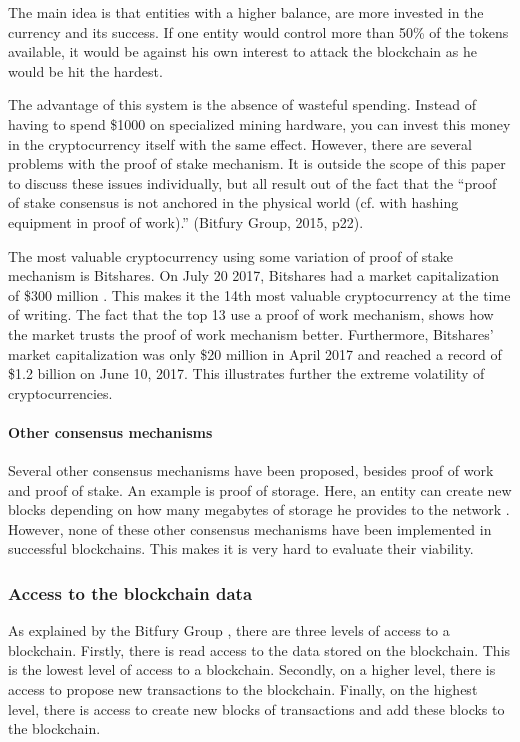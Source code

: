 The main idea is that entities with a higher balance, are more invested in the currency and its success. If one entity would control more than 50\% of the tokens available, it would be against his own interest to attack the blockchain as he would be hit the hardest. 

The advantage of this system is the absence of wasteful spending. Instead of having to spend \$1000 on specialized mining hardware, you can invest this money in the cryptocurrency itself with the same effect. However, there are several problems with the proof of stake mechanism. It is outside the scope of this paper to discuss these issues individually, but all result out of the fact that the ``proof of stake consensus is not anchored in the physical world (cf. with hashing equipment in proof of work).'' (Bitfury Group, 2015, p22). 

The most valuable cryptocurrency using some variation of proof of stake mechanism is Bitshares. On July 20 2017, Bitshares had a market capitalization of \$300 million \cite{general-market-cap}. This makes it the 14th most valuable cryptocurrency at the time of writing. The fact that the top 13 use a proof of work mechanism, shows how the market trusts the proof of work mechanism better. Furthermore, Bitshares' market capitalization was only \$20 million in April 2017 and reached a record of \$1.2 billion on June 10, 2017. This illustrates further the extreme volatility of cryptocurrencies.

\paragraph{Other consensus mechanisms}

Several other consensus mechanisms have been proposed, besides proof of work and proof of stake. An example is proof of storage. Here, an entity can create new blocks depending on how many megabytes of storage he provides to the network \cite{proof-of-whatever}. However, none of these other consensus mechanisms have been implemented in successful blockchains. This makes it is very hard to evaluate their viability. 

\subsubsection{Access to the blockchain data}

As explained by the Bitfury Group \cite{bitfury-permissioned}, there are three levels of access to a blockchain. Firstly, there is read access to the data stored on the blockchain. This is the lowest level of access to a blockchain. Secondly, on a higher level, there is access to propose new transactions to the blockchain. Finally, on the highest level, there is access to create new blocks of transactions and add these blocks to the blockchain.


